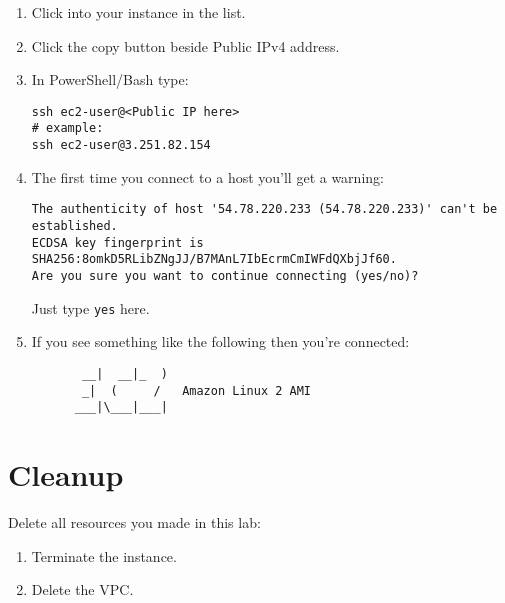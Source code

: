 \documentclass{pgnotes}
\begin{document}
\begin{enumerate}
\item Click into your instance in the list.

\item Click the copy button beside Public IPv4 address.

\item In PowerShell/Bash type:
\begin{verbatim}
ssh ec2-user@<Public IP here>
# example:
ssh ec2-user@3.251.82.154
\end{verbatim}

\item
The first time you connect to a host you'll get a warning:

\begin{verbatim}
The authenticity of host '54.78.220.233 (54.78.220.233)' can't be established.
ECDSA key fingerprint is SHA256:8omkD5RLibZNgJJ/B7MAnL7IbEcrmCmIWFdQXbjJf60.
Are you sure you want to continue connecting (yes/no)?
\end{verbatim}

Just type \texttt{yes} here.

\item 
If you see something like the following then you're connected:

\begin{verbatim}
       __|  __|_  )
       _|  (     /   Amazon Linux 2 AMI
      ___|\___|___|
\end{verbatim}

\end{enumerate}

\section{Cleanup}

Delete all resources you made in this lab:
\begin{enumerate}
\item Terminate the instance.
\item Delete the VPC.
\end{enumerate}
\end{document}
